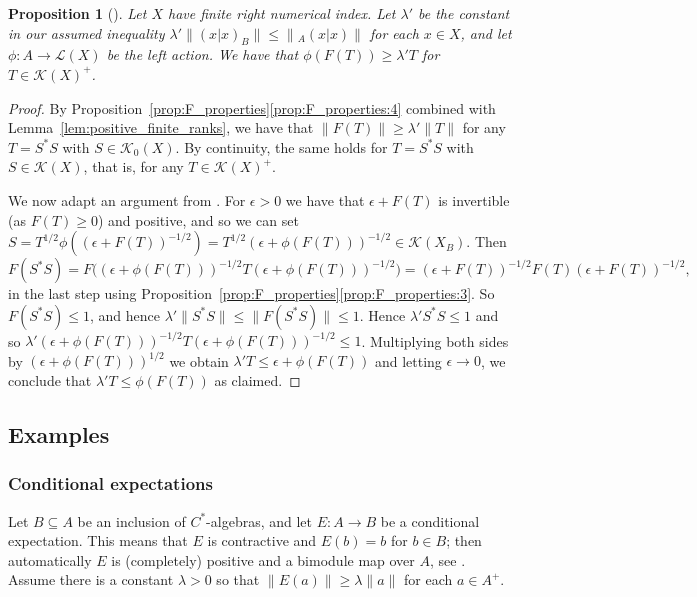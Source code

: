 \documentclass[a4paper,11pt]{article}
\theoremstyle{plain}
\newtheorem{proposition}{Proposition}[section]
\theoremstyle{remark}
\newcommand{\mc}[1]{\mathcal{#1}}
\begin{document}
\begin{proposition}[{\cite[Corollary~2.11]{KPW_JonesIndexTheory}}]\label{prop:Jones1}
Let $X$ have finite right numerical index.
Let $\lambda'$ be the constant in our assumed inequality $\lambda' \|(x|x)_B\| \leq \|{}_A(x|x)\|$ for each $x\in X$, and let $\phi\colon A\to\mc L(X)$ be the left action.  We have that $\phi(F(T)) \geq \lambda' T$ for $T\in\mc K(X)^+$.
\end{proposition}
\begin{proof}
By Proposition~\ref{prop:F_properties}\ref{prop:F_properties:4} combined with Lemma~\ref{lem:positive_finite_ranks}, we have that $\|F(T)\| \geq \lambda'\|T\|$ for any $T = S^*S$ with $S\in\mc K_0(X)$.  By continuity, the same holds for $T=S^*S$ with $S\in\mc K(X)$, that is, for any $T\in\mc K(X)^+$.

We now adapt an argument from \cite[Pages~90--91]{FK_CondExpFinIdx}.  For $\epsilon>0$ we have that $\epsilon + F(T)$ is invertible (as $F(T)\geq0$) and positive, and so we can set $S = T^{1/2} \phi((\epsilon+F(T))^{-1/2}) = T^{1/2} (\epsilon + \phi(F(T)))^{-1/2} \in \mc K(X_B)$.  Then
\[ F(S^*S) = F\big( (\epsilon + \phi(F(T)))^{-1/2} T (\epsilon + \phi(F(T)))^{-1/2} \big)
= (\epsilon +F(T))^{-1/2} F(T) (\epsilon +F(T))^{-1/2}, \]
in the last step using Proposition~\ref{prop:F_properties}\ref{prop:F_properties:3}.  So $F(S^*S) \leq 1$, and hence $\lambda' \|S^*S\| \leq \|F(S^*S)\| \leq 1$.  Hence $\lambda' S^*S \leq 1$ and so $\lambda' (\epsilon + \phi(F(T)))^{-1/2} T (\epsilon + \phi(F(T)))^{-1/2} \leq 1$.  Multiplying both sides by $(\epsilon + \phi(F(T)))^{1/2}$ we obtain $\lambda' T \leq \epsilon + \phi(F(T))$ and letting $\epsilon \to 0$, we conclude that $\lambda' T \leq \phi(F(T))$ as claimed.
\end{proof}



\subsection{Examples}

\subsubsection{Conditional expectations}\label{sec:eg_ce}

Let $B \subseteq A$ be an inclusion of $C^*$-algebras, and let $E\colon A\to B$ be a conditional expectation.  This means that $E$ is contractive and $E(b)=b$ for $b\in B$; then automatically $E$ is (completely) positive and a bimodule map over $A$, see \cite[Theorem~III.3.4]{TakesakiI}.   Assume there is a constant $\lambda>0$ so that $\|E(a)\| \geq \lambda \|a\|$ for each $a\in A^+$.  
\end{document}

